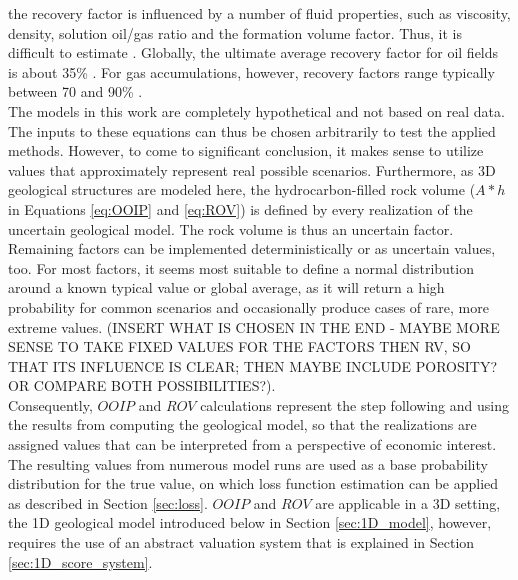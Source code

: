         the recovery factor is influenced by a number of fluid properties, such as viscosity, density, solution oil/gas ratio and the formation volume factor. Thus, it is difficult to estimate \citep{dean2007volumetric}. Globally, the ultimate average recovery factor for oil fields is about 35\% \citep{labastie2011increasingRF}. For gas accumulations, however, recovery factors range typically between 70 and 90\% \citep{dean2007volumetric}.\\
        The models in this work are completely hypothetical and not based on real data. The inputs to these equations can thus be chosen arbitrarily to test the applied methods. However, to come to significant conclusion, it makes sense to utilize values that approximately represent real possible scenarios. Furthermore, as 3D geological structures are modeled here, the hydrocarbon-filled rock volume ($A * h$ in Equations \ref{eq:OOIP} and \ref{eq:ROV}) is defined by every realization of the uncertain geological model. The rock volume is thus an uncertain factor. Remaining factors can be implemented deterministically or as uncertain values, too. For most factors, it seems most suitable to define a normal distribution around a known typical value or global average, as it will return a high probability for common scenarios and occasionally produce cases of rare, more extreme values. (INSERT WHAT IS CHOSEN IN THE END - MAYBE MORE SENSE TO TAKE FIXED VALUES FOR THE FACTORS THEN RV, SO THAT ITS INFLUENCE IS CLEAR; THEN MAYBE INCLUDE POROSITY? OR COMPARE BOTH POSSIBILITIES?).\\
        Consequently, $OOIP$ and $ROV$ calculations represent the step following and using the results from computing the geological model, so that the realizations are assigned values that can be interpreted from a perspective of economic interest. The resulting values from numerous model runs are used as a base probability distribution for the true value, on which loss function estimation can be applied as described in Section \ref{sec:loss}. $OOIP$ and $ROV$ are applicable in a 3D setting, the 1D geological model introduced below in Section \ref{sec:1D_model}, however, requires the use of an abstract valuation system that is explained in Section \ref{sec:1D_score_system}.
		
